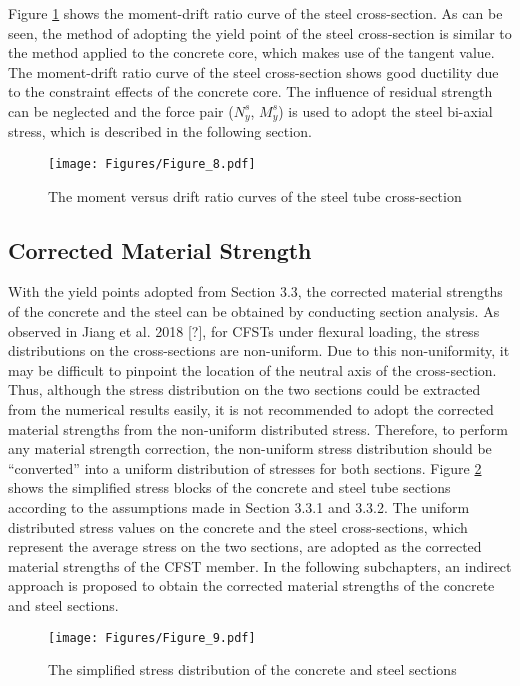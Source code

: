 \documentclass[12pt,a4]{article}
\begin{document}
	\par
	Figure \ref{fig-7} shows the moment-drift ratio curve of the steel cross-section. As can be seen, the method of adopting the yield point of the steel cross-section is similar to the method applied to the concrete core, which makes use of the tangent value. The moment-drift ratio curve of the steel cross-section shows good ductility due to the constraint effects of the concrete core. The influence of residual strength can be neglected and the force pair ($N_y^s$, $M_y^s$) is used to adopt the steel bi-axial stress, which is described in the following section.
	\par
	\begin{figure}[h]
		\centering
		\texttt{[image: Figures/Figure\_8.pdf]}
		\caption{The moment versus drift ratio curves of the steel tube cross-section}
		\label{fig-7}
	\end{figure}
	\par
	\subsection{Corrected Material Strength}
	With the yield points adopted from Section 3.3, the corrected material strengths of the concrete and the steel can be obtained by conducting section analysis. As observed in Jiang et al. 2018 [?], for CFSTs under flexural loading, the stress distributions on the cross-sections are non-uniform. Due to this non-uniformity, it may be difficult to pinpoint the location of the neutral axis of the cross-section. Thus, although the stress distribution on the two sections could be extracted from the numerical results easily, it is not recommended to adopt the corrected material strengths from the non-uniform distributed stress. Therefore, to perform any material strength correction, the non-uniform stress distribution should be “converted” into a uniform distribution of stresses for both sections. Figure \ref{fig-8} shows the simplified stress blocks of the concrete and steel tube sections according to the assumptions made in Section 3.3.1 and 3.3.2. The uniform distributed stress values on the concrete and the steel cross-sections, which represent the average stress on the two sections, are adopted as the corrected material strengths of the CFST member. In the following subchapters, an indirect approach is proposed to obtain the corrected material strengths of the concrete and steel sections.
	\par
	\begin{figure}[h]
		\centering
		\texttt{[image: Figures/Figure\_9.pdf]}
		\caption{The simplified stress distribution of the concrete and steel sections}
		\label{fig-8}
	\end{figure}
	\par
\end{document}
